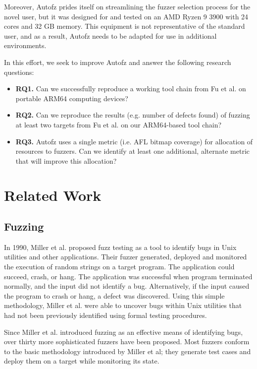 Moreover, Autofz prides itself on streamlining the fuzzer selection process for the novel user, but 
it was designed for and tested on an AMD Ryzen 9 3900 with 24 cores and 32 GB memory. This equipment 
is not representative of the standard user, and as a result, Autofz needs to be adapted for use in 
additional environments. \cite{Fu}

In this effort, we seek to improve Autofz and answer the following research questions:
\begin{itemize}
    \item \textbf{RQ1.} Can we successfully reproduce a working tool chain from
    Fu et al. \cite{Fu} on portable ARM64 computing devices?
    \item \textbf{RQ2.} Can we reproduce the results (e.g. number of defects found)
     of fuzzing at least two targets from Fu et al. \cite{Fu} on our ARM64-based
      tool chain?
    \item \textbf{RQ3.} Autofz uses a single metric (i.e. AFL bitmap coverage) for
     allocation of resources to fuzzers. Can we identify at least one additional,
     alternate metric that will improve this allocation?
\end{itemize}

\section{Related Work}

\subsection{Fuzzing}
In 1990, Miller et al. proposed fuzz testing as a tool to identify bugs in Unix utilities and other 
applications. Their fuzzer generated, deployed and monitored the execution of random strings on a 
target program. The application could succeed, crash, or hang. The application was successful when 
program terminated normally, and the input did not identify a bug. Alternatively, if the input caused 
the program to crash or hang, a defect was discovered. Using this simple methodology, Miller et al. 
were able to uncover bugs within Unix utilities that had not been previously identified using formal 
testing procedures. \cite{Miller}

Since Miller et al. introduced fuzzing as an effective means of identifying bugs, over thirty more 
sophisticated fuzzers have been proposed. Most fuzzers conform to the basic methodology introduced by 
Miller et al; they generate test cases and deploy them on a target while monitoring its state. 

